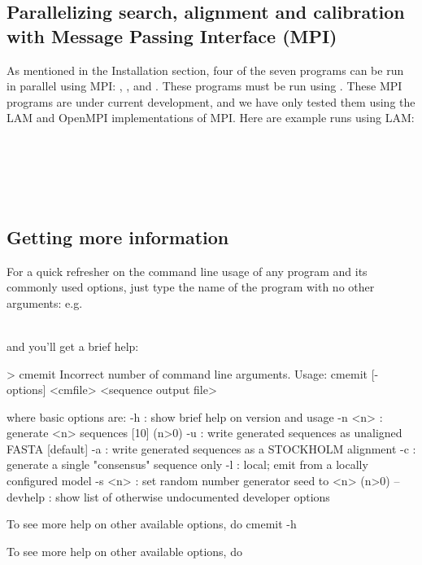 \subsection{Parallelizing search, alignment and calibration with Message Passing
  Interface (MPI)}
As mentioned in the Installation section, four of
the seven  programs can be run in parallel using
MPI: , ,  and .
These programs must be run using . These MPI programs are
under current development, and we have only tested them using the LAM
and OpenMPI implementations of MPI. Here are example runs using LAM:  

\\

\\

\\

\\

\subsection{Getting more information}

For a quick refresher on the command line usage of any program and its
commonly used options, just type the name of the program with no other
arguments: e.g.\

\\

and you'll get a brief help:

\begin{sreoutput}
> cmemit
Incorrect number of command line arguments.
Usage: cmemit [-options] <cmfile> <sequence output file>

  where basic options are:
  -h        : show brief help on version and usage
  -n <n>    : generate <n> sequences  [10]  (n>0)
  -u        : write generated sequences as unaligned FASTA  [default]
  -a        : write generated sequences as a STOCKHOLM alignment
  -c        : generate a single "consensus" sequence only
  -l        : local; emit from a locally configured model
  -s <n>    : set random number generator seed to <n>  (n>0)
  --devhelp : show list of otherwise undocumented developer options

To see more help on other available options, do cmemit -h
\end{sreoutput}
To see more help on other available options, do 

